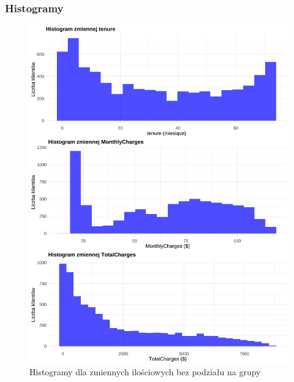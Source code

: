 \documentclass[12pt, a4paper]{article}\usepackage[]{graphicx}\usepackage[]{xcolor}
\makeatletter
\def\maxwidth{ %
  \ifdim\Gin@nat@width>\linewidth
    \linewidth
  \else
    \Gin@nat@width
  \fi
}
\newenvironment{knitrout}{}{} %
\makeatother
\begin{document}
\subsubsection{Histogramy}
\begin{knitrout}
\color{fgcolor}\begin{figure}[H]

{\centering \includegraphics[width=\maxwidth]{figure/histogramy-wszystkie-dane-1} 

}

\caption[Histogramy dla zmiennych ilościowych bez podziału na grupy]{Histogramy dla zmiennych ilościowych bez podziału na grupy}\label{fig:histogramy-wszystkie-dane}
\end{figure}

\end{knitrout}
\end{document}

